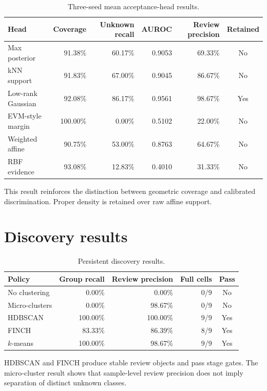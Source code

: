 \documentclass[12pt,oneside]{report}
\begin{document}
\begin{table}[ht]
\centering
\caption{Three-seed mean acceptance-head results.}
\label{tab:acceptance}
\scriptsize
\begin{tabular}{lrrrrc}
\toprule
Head & Coverage & Unknown recall & AUROC & Review precision & Retained\\
\midrule
Max posterior & 91.38\% & 60.17\% & 0.9053 & 69.33\% & No\\
kNN support & 91.83\% & 67.00\% & 0.9045 & 86.67\% & No\\
Low-rank Gaussian & 92.08\% & 86.17\% & 0.9561 & 98.67\% & Yes\\
EVM-style margin & 100.00\% & 0.00\% & 0.5102 & 22.00\% & No\\
Weighted affine & 90.75\% & 53.00\% & 0.8763 & 64.67\% & No\\
RBF evidence & 93.08\% & 12.83\% & 0.4010 & 31.33\% & No\\
\bottomrule
\end{tabular}
\end{table}

This result reinforces the distinction between geometric coverage and
calibrated discrimination. Proper density is retained over raw affine support.

\section{Discovery results}

\begin{table}[ht]
\centering
\caption{Persistent discovery results.}
\label{tab:discovery}
\begin{tabular}{lrrrc}
\toprule
Policy & Group recall & Review precision & Full cells & Pass\\
\midrule
No clustering & 0.00\% & 0.00\% & 0/9 & No\\
Micro-clusters & 0.00\% & 98.67\% & 0/9 & No\\
HDBSCAN & 100.00\% & 100.00\% & 9/9 & Yes\\
FINCH & 83.33\% & 86.39\% & 8/9 & Yes\\
$k$-means & 100.00\% & 98.67\% & 9/9 & Yes\\
\bottomrule
\end{tabular}
\end{table}

HDBSCAN and FINCH produce stable review objects and pass stage gates. The
micro-cluster result shows that sample-level review precision does not imply
separation of distinct unknown classes.
\end{document}
